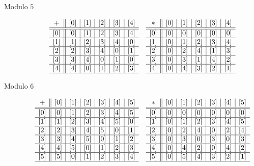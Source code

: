 \documentclass{../ximera}
\begin{document}
\begin{br}
\begin{description}
 \item[Modulo $5$] 
 \begin{align*}
& \begin{array}{c||c|c|c|c|c}
 + & [0] & [1] & [2] & [3] & [4]\\ \hline\hline
 [0] & [0] & [1] & [2] & [3] & [4]\\ \hline
 [1] & [1] & [2] & [3] & [4] & [0] \\ \hline
 [2] & [2] & [3] & [4] & [0] & [1]\\ \hline
 [3] & [3] & [4] & [0] & [1] & [0]\\ \hline
 [4] & [4] & [0] & [1] & [2] & [3]\\ \hline
\end{array}
& \begin{array}{c||c|c|c|c|c}
 \ast & [0] & [1] & [2] & [3] & [4]\\ \hline\hline
 [0] & [0] & [0] & [0] & [0] & [0]\\ \hline
 [1] & [0] & [1] & [2] & [3] & [4]\\ \hline
 [2] & [0] & [2] & [4] & [1] & [3]\\ \hline
 [3] & [0] & [3] & [1] & [4] & [2]\\ \hline
 [4] & [0] & [4] & [3] & [2] & [1]\\ \hline
\end{array}
\end{align*}

 \item[Modulo $6$] 
 \begin{align*}
& \begin{array}{c||c|c|c|c|c|c}
 + & [0] & [1] & [2] & [3] & [4] & [5]\\ \hline\hline
 [0] & [0] & [1] & [2] & [3] & [4] & [5]\\ \hline
 [1] & [1] & [2] & [3] & [4] & [5] & [0] \\ \hline
 [2] & [2] & [3] & [4] & [5] & [0] & [1]\\ \hline
 [3] & [3] & [4] & [5] & [0] & [1] & [2]\\ \hline
 [4] & [4] & [5] & [0] & [1] & [2] & [3]\\ \hline
 [5] & [5] & [0] & [1] & [2] & [3] & [4]\\ \hline
\end{array}
& \begin{array}{c||c|c|c|c|c|c}
 \ast & [0] & [1] & [2] & [3] & [4] & [5]\\ \hline\hline
 [0] & [0] & [0] & [0] & [0] & [0] & [0]\\ \hline
 [1] & [0] & [1] & [2] & [3] & [4] & [5]\\ \hline
 [2] & [0] & [2] & [4] & [0] & [2] & [4]\\ \hline
 [3] & [0] & [3] & [0] & [3] & [0] & [3]\\ \hline
 [4] & [0] & [4] & [2] & [0] & [4] & [2]\\ \hline
 [5] & [0] & [5] & [4] & [3] & [2] & [1]\\ \hline
\end{array}
\end{align*}


\end{description}
\end{br}
\end{document}
